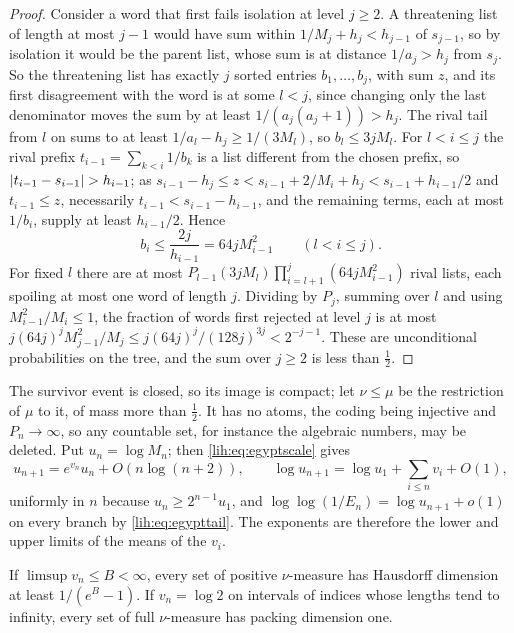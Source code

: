\begin{proof}
Consider a word that first fails isolation at level $j\ge2$. A threatening list of length at most $j-1$
would have sum within $1/M_j+h_j<h_{j-1}$ of $s_{j-1}$, so by isolation it would be the parent list, whose sum
is at distance $1/a_j>h_j$ from $s_j$. So the threatening list has exactly $j$ sorted entries $b_1,\dots,b_j$, with
sum $z$, and its first disagreement with the word is at some $l<j$, since changing only the last
denominator moves the sum by at least $1/(a_j(a_j+1))>h_j$. The rival tail from $l$ on sums to at least
$1/a_l-h_j\ge1/(3M_l)$, so $b_l\le3jM_l$. For $l<i\le j$ the rival prefix $t_{i-1}=\sum_{k<i}1/b_k$ is a list different
from the chosen prefix, so $\lvert t_{i-1}-s_{i-1}\rvert>h_{i-1}$; as
$s_{i-1}-h_j\le z<s_{i-1}+2/M_i+h_j<s_{i-1}+h_{i-1}/2$ and $t_{i-1}\le z$, necessarily $t_{i-1}<s_{i-1}-h_{i-1}$, and the
remaining terms, each at most $1/b_i$, supply at least $h_{i-1}/2$. Hence
\[
 b_i\le\frac{2j}{h_{i-1}}=64jM_{i-1}^2\qquad(l<i\le j).
\]
For fixed $l$ there are at most $P_{l-1}(3jM_l)\prod_{i=l+1}^j(64jM_{i-1}^2)$ rival lists, each spoiling at most one
word of length $j$. Dividing by $P_j$, summing over $l$ and using $M_{i-1}^2/M_i\le1$, the fraction of words
first rejected at level $j$ is at most $j(64j)^jM_{j-1}^2/M_j\le j(64j)^j/(128j)^{3j}<2^{-j-1}$. These are
unconditional probabilities on the tree, and the sum over $j\ge2$ is less than $\frac12$.
\end{proof}

The survivor event is closed, so its image is compact; let $\nu\le\mu$ be the restriction of $\mu$ to it, of
mass more than $\frac12$. It has no atoms, the coding being injective and $P_n\to\infty$, so any countable set,
for instance the algebraic numbers, may be deleted. Put $u_n=\log M_n$; then \eqref{lih:eq:egyptscale}
gives
\begin{equation}\label{lih:eq:egyptmean}
 u_{n+1}=e^{v_n}u_n+O(n\log(n+2)),\qquad\log u_{n+1}=\log u_1+\sum_{i\le n}v_i+O(1),
\end{equation}
uniformly in $n$ because $u_n\ge2^{n-1}u_1$, and $\log\log(1/E_n)=\log u_{n+1}+o(1)$ on every branch by
\eqref{lih:eq:egypttail}. The exponents are therefore the lower and upper limits of the means of the $v_i$.

\begin{lemma}\label{lih:lem:egyptdim}
If $\limsup v_n\le B<\infty$, every set of positive $\nu$-measure has Hausdorff dimension at least $1/(e^B-1)$.
If $v_n=\log2$ on intervals of indices whose lengths tend to infinity, every set of full $\nu$-measure has
packing dimension one.
\end{lemma}

